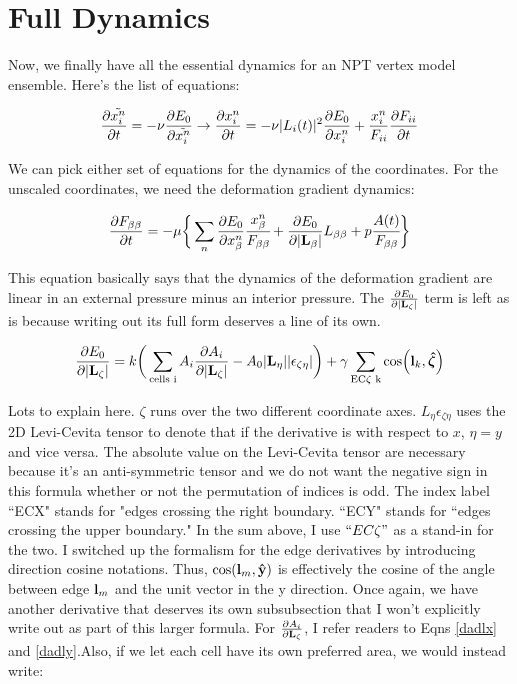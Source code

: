 \documentclass[12pt]{article}
\begin{document}
\section{Full Dynamics}
Now, we finally have all the essential dynamics for an NPT vertex model ensemble. Here's the list of equations:
\begin{center}
\begin{equation}
\label{eqn: coordinatedyn}
\pdv{\tilde{x_i^n}}{t} = -\nu \pdv{E_0}{\tilde{x_i^n}} \rightarrow \pdv{x_i^n}{t}  = -\nu |L_i(t)|^2\pdv{E_0}{x_i^n} + \frac{x_i^n}{F_{ii}} \pdv{F_{ii}}{t}
\end{equation}
\end{center}
We can pick either set of equations for the dynamics of the coordinates. For the unscaled coordinates, we need the deformation gradient dynamics:
\begin{center}
\begin{equation}
\label{eqn: deformationdyn}
\pdv{F_{\beta \beta}}{t} = -\mu\bigg\{\sum\limits_{n} \pdv{E_0}{x_\beta^n}  \cfrac{x_\beta^n}{F_{\beta \beta}} +  \pdv{E_0}{|\vb{L}_\beta|} L_{\beta \beta} + p \cfrac{A(t)}{F_{\beta\beta}}\bigg\}
\end{equation}
\end{center}
This equation basically says that the dynamics of the deformation gradient are linear in an external pressure minus an interior pressure. The $\pdv{E_0}{|\vb{L}_\zeta|}$ term is left as is because writing out its full form deserves a line of its own.
\begin{center}
\begin{equation}
\label{eqn: pbcd}
\pdv{E_0}{|\vb{L}_\zeta|} = k \bigg( \sum\limits_{\text{cells i}} A_i \pdv{A_i}{|\vb{L}_\zeta|} - A_0 |\vb{L}_\eta| |\epsilon_{\zeta \eta}|\bigg) + \gamma \sum\limits_{\text{EC}\zeta\text{ k}} \cos(\vb{l}_k, \vu*{\zeta}) 
\end{equation}
\end{center}
Lots to explain here. $\zeta$ runs over the two different coordinate axes. $L_\eta \epsilon_{\zeta\eta}$ uses the 2D Levi-Cevita tensor to denote that if the derivative is with respect to $x$, $\eta = y$ and vice versa. The absolute value on the Levi-Cevita tensor are necessary because it's an anti-symmetric tensor and we do not want the negative sign in this formula whether or not the permutation of indices is odd. The index label ``ECX" stands for "edges crossing the right boundary. ``ECY" stands for ``edges crossing the upper boundary." In the sum above, I use $``EC{\zeta}"$ as a stand-in for the two. I switched up the formalism for the edge derivatives by introducing direction cosine notations. Thus, $\cos(\vb{l}_m, \vu{y})$ is effectively the cosine of the angle between edge $\vb{l}_m$ and the unit vector in the y direction. Once again, we have another derivative that deserves its own subsubsection that I won't explicitly write out as part of this larger formula. For $\pdv{A_i}{{\vb{L}_\zeta}}$, I refer readers to Eqns \ref{dadlx} and \ref{dadly}.Also, if we let each cell have its own preferred area, we would instead write:
\end{document}
